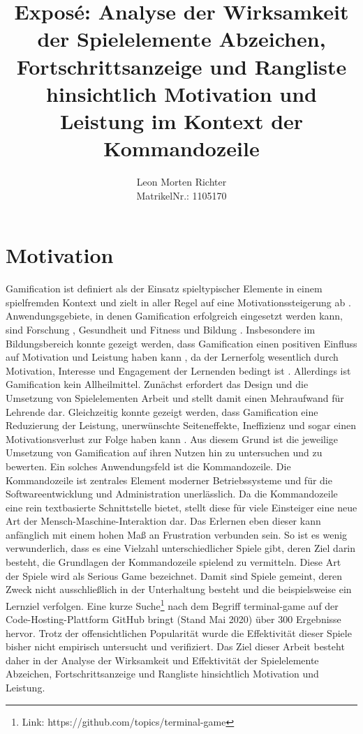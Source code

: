 \documentclass[
    a4paper,
    doc,
    12pt,
    natbib,
]{apa6}
\title{Exposé: Analyse der Wirksamkeit  der Spielelemente Abzeichen, Fortschrittsanzeige und Rangliste hinsichtlich Motivation und Leistung im Kontext der Kommandozeile}
\author{Leon Morten Richter\\MatrikelNr.: 1105170}
\affiliation{Christian-Albrechts-Universität zu Kiel}
\begin{document}
\maketitle

\section{Motivation}
Gamification ist definiert als der Einsatz spieltypischer Elemente in einem spielfremden Kontext \citep{deterding_game_2011} und zielt in aller Regel auf eine Motivationssteigerung ab \citep{takahashi_gamification_2010}. Anwendungsgebiete, in denen Gamification erfolgreich eingesetzt werden kann, sind Forschung \citep{brauer_erhohung_2019}, Gesundheit und Fitness \citep{johnson_gamification_2016} und Bildung \citep{de_freitas_prepared_2006}. Insbesondere im Bildungsbereich konnte gezeigt werden, dass Gamification einen positiven Einfluss auf Motivation und Leistung haben kann \citep{ibanez_gamification_2014}, da der Lernerfolg wesentlich durch Motivation, Interesse und Engagement der Lernenden bedingt ist \citep{astin_student_1984}. Allerdings ist Gamification kein Allheilmittel. Zunächst erfordert das Design und die Umsetzung von Spielelementen Arbeit und stellt damit einen Mehraufwand für Lehrende dar. Gleichzeitig konnte gezeigt werden, dass Gamification eine Reduzierung der Leistung, unerwünschte Seiteneffekte, Ineffizienz und sogar einen Motivationsverlust zur Folge haben kann \citep{toda_dark_2018}. Aus diesem Grund ist die jeweilige Umsetzung von Gamification auf ihren Nutzen hin zu untersuchen und zu bewerten. Ein solches Anwendungsfeld ist die Kommandozeile. Die Kommandozeile ist zentrales Element moderner Betriebssysteme und für die Softwareentwicklung und Administration unerlässlich. Da die Kommandozeile eine rein textbasierte Schnittstelle bietet, stellt diese für viele Einsteiger eine neue Art der Mensch-Maschine-Interaktion dar. Das Erlernen eben dieser kann anfänglich mit einem hohen Maß an Frustration verbunden sein. So ist es wenig verwunderlich, dass es eine Vielzahl unterschiedlicher Spiele gibt, deren Ziel darin besteht, die Grundlagen der Kommandozeile spielend zu vermitteln. Diese Art der Spiele wird als Serious Game bezeichnet. Damit sind Spiele gemeint, deren Zweck nicht ausschließlich in der Unterhaltung besteht \citep{djaouti_classifying_2011} und die beispielsweise ein Lernziel verfolgen. Eine kurze Suche\footnote{Link: https://github.com/topics/terminal-game} nach dem Begriff \glqq terminal-game\grqq{} auf der Code-Hosting-Plattform GitHub bringt (Stand Mai 2020) über 300 Ergebnisse hervor. Trotz der offensichtlichen Popularität wurde die Effektivität dieser Spiele bisher nicht empirisch untersucht und verifiziert. Das Ziel dieser Arbeit besteht daher in der Analyse der Wirksamkeit und Effektivität der Spielelemente Abzeichen, Fortschrittsanzeige und Rangliste hinsichtlich Motivation und Leistung.
\end{document}

